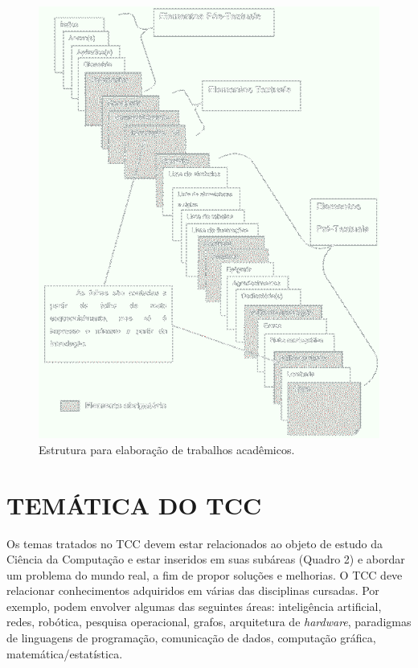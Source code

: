 \begin{figure}[htb]
	\centering
	\includegraphics[scale=0.6]{imagens/Estrutura-Trabalhos.png} 
	\caption{Estrutura para elaboração de trabalhos acadêmicos.}
	\label{fig:EstruturaTrab}
\end{figure}

\section{TEMÁTICA DO TCC}\label{sec:TEMÁTICATCC}
Os temas tratados no TCC devem estar relacionados ao objeto de estudo da Ciência da Computação e estar inseridos em suas subáreas (Quadro 2) e abordar um problema do mundo real, a fim de propor soluções e melhorias. O TCC deve relacionar conhecimentos adquiridos em várias das disciplinas cursadas. Por exemplo, podem envolver algumas das seguintes áreas: inteligência artificial, redes, robótica, pesquisa operacional, grafos, arquitetura de \textit{hardware}, paradigmas de linguagens de programação, comunicação de dados, computação gráfica, matemática/estatística.  

